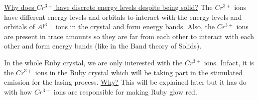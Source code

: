 \uline{Why does $Cr^{3+}$ have discrete energy levels despite being solid?} The $Cr^{3+}$ ions have different energy levels and orbitals to interact with the energy levels and orbitals of $Al^{3+}$ ions in the crystal and form energy bands. Also, the $Cr^{3+}$ ions are present in trace amounts so they are far from each other to interact with each other and form energy bands (like in the Band theory of Solids). \vspace{.2cm}

In the whole Ruby crystal, we are only interested with the $Cr^{3+}$ ions. Infact, it is the $Cr^{3+}$ ions in the Ruby crystal which will be taking part in the stimulated emission for the lasing process. \uline{Why?} This will be explained later but it has do with how $Cr^{3+}$ ions are responsible for making Ruby glow red.